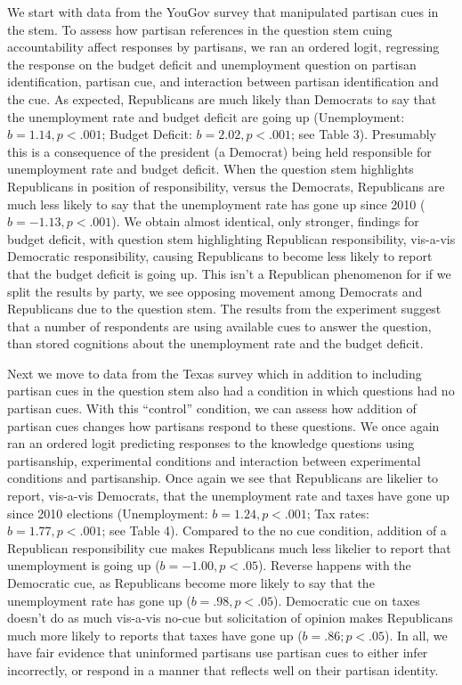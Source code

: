 \documentclass[12pt, letterpaper]{article}
\begin{document}
We start with data from the YouGov survey that manipulated partisan cues in the stem. To assess how partisan references in the question stem cuing accountability affect responses by partisans, we ran an ordered logit, regressing the response on the budget deficit and unemployment question on partisan identification, partisan cue, and interaction between partisan identification and the cue. As expected, Republicans are much likely than Democrats to say that the unemployment rate and budget deficit are going up (Unemployment: $b = 1.14, p < .001$; Budget Deficit: $b = 2.02, p < .001$; see Table 3). Presumably this is a consequence of the president (a Democrat) being held responsible for unemployment rate and budget deficit. When the question stem highlights Republicans in position of responsibility, versus the Democrats, Republicans are much less likely to say that the unemployment rate has gone up since 2010 ($b = -1.13, p < .001$). We obtain almost identical, only stronger, findings for budget deficit, with question stem highlighting Republican responsibility, vis-a-vis Democratic responsibility, causing Republicans to become less likely to report that the budget deficit is going up. This isn’t a Republican phenomenon for if we split the results by party, we see opposing movement among Democrats and Republicans due to the question stem. The results from the experiment suggest that a number of respondents are using available cues to answer the question, than stored cognitions about the unemployment rate and the budget deficit. 

Next we move to data from the Texas survey which in addition to including partisan cues in the question stem also had a condition in which questions had no partisan cues. With this ``control'' condition, we can assess how addition of partisan cues changes how partisans respond to these questions. We once again ran an ordered logit predicting responses to the knowledge questions using partisanship, experimental conditions and interaction between experimental conditions and partisanship. Once again we see that Republicans are likelier to report, vis-a-vis Democrats, that the unemployment rate and taxes have gone up since 2010 elections (Unemployment: $b = 1.24, p < .001$;  Tax rates: $b= 1.77, p < .001$; see Table 4). Compared to the no cue condition, addition of a Republican responsibility cue makes Republicans much less likelier to report that unemployment is going up ($b = -1.00, p < .05$). Reverse happens with the Democratic cue, as Republicans become more likely to say that the unemployment rate has gone up ($b= .98, p < .05$). Democratic cue on taxes doesn't do as much vis-a-vis no-cue but solicitation of opinion makes Republicans much more likely to reports that taxes have gone up ($b = .86; p < .05$). In all, we have fair evidence that uninformed partisans use partisan cues to either infer incorrectly, or respond in a manner that reflects well on their partisan identity. 
\end{document}
